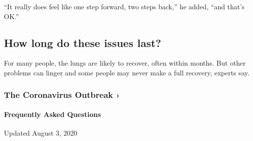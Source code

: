 ``It really does feel like one step forward, two steps back,'' he added,
``and that's OK.''

\hypertarget{how-long-do-these-issues-last}{%
\subsection{How long do these issues
last?}\label{how-long-do-these-issues-last}}

For many people, the lungs are likely to recover, often within months.
But other problems can linger and some people may never make a full
recovery, experts say.

\href{https://www.nytimes.com/news-event/coronavirus?action=click\&pgtype=Article\&state=default\&region=MAIN_CONTENT_3\&context=storylines_faq}{}

\hypertarget{the-coronavirus-outbreak-}{%
\subsubsection{The Coronavirus Outbreak
›}\label{the-coronavirus-outbreak-}}

\hypertarget{frequently-asked-questions}{%
\paragraph{Frequently Asked
Questions}\label{frequently-asked-questions}}

Updated August 3, 2020

